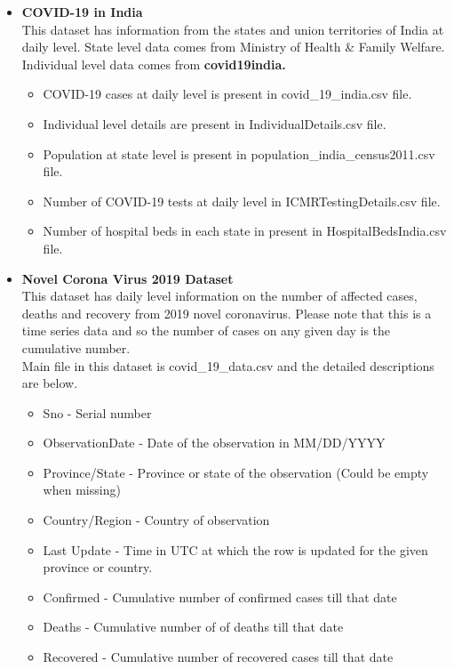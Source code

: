 \documentclass{article}
\begin{document}
\begin{itemize}
\item \textbf{COVID-19 in India}
\newline
\\This dataset has information from the states and union territories of India at daily level. State level data comes from Ministry of Health \& Family Welfare. Individual level data comes from \textbf{covid19india.}
\begin{itemize}
\item COVID-19 cases at daily level is present in covid\_19\_india.csv file.
\item Individual level details are present in IndividualDetails.csv file.
\item Population at state level is present in population\_india\_census2011.csv file.
\item Number of COVID-19 tests at daily level in ICMRTestingDetails.csv file.
\item Number of hospital beds in each state in present in HospitalBedsIndia.csv file.
\end{itemize}
\item \textbf{Novel Corona Virus 2019 Dataset}
\newline
\\This dataset has daily level information on the number of affected cases, deaths and recovery from 2019 novel coronavirus. Please note that this is a time series data and so the number of cases on any given day is the cumulative number.
\\Main file in this dataset is covid\_19\_data.csv and the detailed descriptions are below.
\begin{itemize}
\item Sno - Serial number
\item ObservationDate - Date of the observation in MM/DD/YYYY
\item Province/State - Province or state of the observation (Could be empty when missing)
\item Country/Region - Country of observation
\item Last Update - Time in UTC at which the row is updated for the given province or country. 
\item Confirmed - Cumulative number of confirmed cases till that date
\item Deaths - Cumulative number of of deaths till that date
\item Recovered - Cumulative number of recovered cases till that date
\end{itemize}
\end{itemize}
\end{document}

